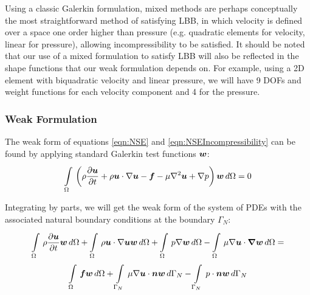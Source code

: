 Using a classic Galerkin formulation, mixed methods are perhaps conceptually the most straightforward method of satisfying LBB, in which velocity is defined over a space one order higher than pressure (e.g. quadratic elements for velocity, linear for pressure), allowing incompressibility to be satisfied. It should be noted that our use of a mixed formulation to satisfy LBB will also be reflected in the shape functions that our weak formulation depends on. For example, using a 2D element with biquadratic velocity and linear pressure, we will have 9 DOFs and weight functions for each velocity component and 4 for the pressure. 

\subsubsection{Weak Formulation}
The weak form of equations \ref{eqn:NSE} and \ref{eqn:NSEIncompressibility} can be found by applying standard Galerkin test functions $\boldsymbol{w}$:
\begin{equation}
 \label{BasicGalerkinNSE}
  \gint{\Omega}{}{\pbrac{\rho\delby{\vectr{u}}{t}
    +\rho\vectr{u}\cdot\gradient{}{\vectr{u}}
    -\vectr{f}
    -\mu\laplacian{\vectr{u}}
    +\gradient{}{p}}{\vectr{w}}}{\Omega} = 0
\end{equation}

Integrating by parts, we will get the weak form of the system of PDEs with the associated natural boundary conditions at the boundary $\Gamma_N$:
\begin{multline}
 \label{GalerkinNSE}
  \gint{\Omega}{}{\rho\delby{\vectr{u}}{t}{\vectr{w}}}{\Omega}
 +\gint{\Omega}{}{\rho\vectr{u}\cdot\grad\vectr{u}{\vectr{w}}}{\Omega}
 +\gint{\Omega}{}{p\gradient{}{\vectr{w}}}{\Omega}
 -\gint{\Omega}{}{\mu\gradient{}{\vectr{u}}\cdot\vectr{\gradient{}{w}}}{\Omega}=\\
 \gint{\Omega}{}{\vectr{f}\vectr{w}}{\Omega}
 +\gint{\Gamma_N}{}{\mu\dotprod{\grad\vectr{u}}{\vectr{n}}\vectr{w}}{\Gamma_N}
 -\gint{\Gamma_N}{}{\dotprod{p}{\vectr{n}}\vectr{w}}{\Gamma_N}
\end{multline}

